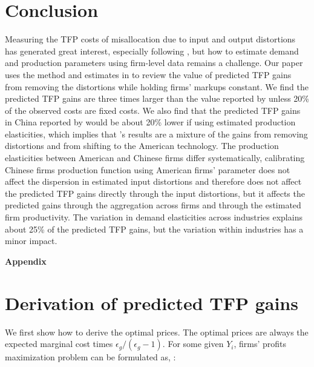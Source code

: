 \documentclass[12pt]{article}
\begin{document}
\section{Conclusion}
Measuring the TFP costs of misallocation due to input and output distortions has generated great interest, especially following \citet{hsiehMisallocationManufacturingTFP2009}, but how to estimate demand and production parameters using firm-level data remains a challenge. Our paper uses the method and estimates in \citet{zhangFactorShares} to review the value of predicted TFP gains from removing the distortions while holding firms' markups constant. We find the predicted TFP gains are three times larger than the value reported by \citet{hsiehMisallocationManufacturingTFP2009} unless 20\% of the observed costs are fixed costs. We also find that the predicted TFP gains in China reported by \citet{hsiehMisallocationManufacturingTFP2009} would be about 20\% lower if using estimated production elasticities, which implies that \citet{hsiehMisallocationManufacturingTFP2009}'s results are a mixture of the gains from removing distortions and from shifting to the American technology. The production elasticities between American and Chinese firms differ systematically, calibrating Chinese firms production function using American firms' parameter does not affect the dispersion in estimated input distortions and therefore does not affect the predicted TFP gains directly through the input distortions, but it affects the predicted gains through the aggregation across firms and through the estimated firm productivity. The variation in demand elasticities across industries explains about 25\% of the predicted TFP gains, but the variation within industries has a minor impact.

\newpage

\setlength\bibsep{0pt}
%
%
 

\newpage

\onehalfspacing
\appendix
\noindent\textbf{\Huge Appendix}

\section{Derivation of predicted TFP gains} \label{ASec:TFPgainsMarketShares}
We first show how to derive the optimal prices. The optimal prices are always the expected marginal cost times $\epsilon_g/(\epsilon_g-1)$. For some given $Y_i$, firms' profits maximization problem can be formulated as, :
\end{document}
